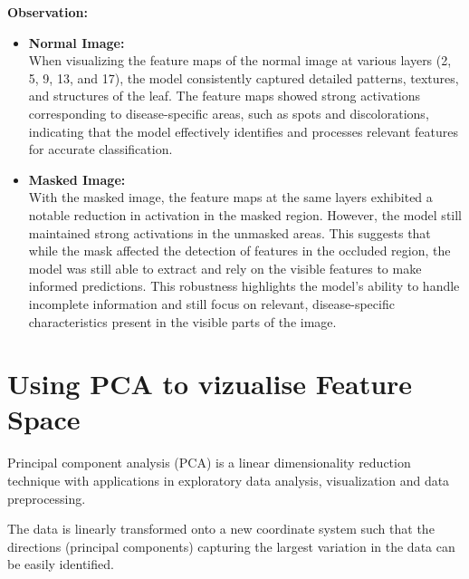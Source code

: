 \textbf{Observation: }
\begin{itemize}
    \item \textbf{Normal Image: }\\
    When visualizing the feature maps of the normal image at various layers (2, 5, 9, 13, and 17), the model consistently captured detailed patterns, textures, and structures of the leaf. The feature maps showed strong activations corresponding to disease-specific areas, such as spots and discolorations, indicating that the model effectively identifies and processes relevant features for accurate classification.
    \item \textbf{Masked Image: }\\
    With the masked image, the feature maps at the same layers exhibited a notable reduction in activation in the masked region. However, the model still maintained strong activations in the unmasked areas. This suggests that while the mask affected the detection of features in the occluded region, the model was still able to extract and rely on the visible features to make informed predictions. This robustness highlights the model's ability to handle incomplete information and still focus on relevant, disease-specific characteristics present in the visible parts of the image.
\end{itemize}

   

\newpage
\section{Using PCA to vizualise Feature Space}
Principal component analysis (PCA) is a linear dimensionality reduction technique with applications in exploratory data analysis, visualization and data preprocessing.

The data is linearly transformed onto a new coordinate system such that the directions (principal components) capturing the largest variation in the data can be easily identified\cite{pca-0}\cite{pca-1}.

